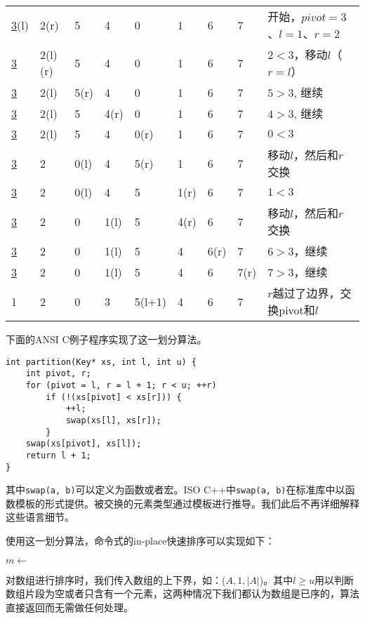 \documentclass[UTF8]{article}
\begin{document}
\begin{tabular}{|llllllll|l|}
\hline
\underline{3}(l)  & 2(r) & 5 & 4 & 0 & 1 & 6 & 7 & 开始，$pivot = 3$、$l = 1$、$r = 2$ \\
\underline{3} & 2(l)(r) & 5 & 4 & 0 & 1 & 6 & 7 & $2 < 3$，移动$l$（$r=l$）\\
\underline{3} & 2(l) & 5(r) & 4 & 0 & 1 & 6 & 7 & $5 > 3$, 继续 \\
\underline{3} & 2(l) & 5 & 4(r) & 0 & 1 & 6 & 7 & $4 > 3$, 继续 \\
\underline{3} & 2(l) & 5 & 4 & 0(r) & 1 & 6 & 7 & $0 < 3$ \\
\underline{3} & 2 & 0(l) & 4 & 5(r) & 1 & 6 & 7 & 移动$l$，然后和$r$交换 \\
\underline{3} & 2 & 0(l) & 4 & 5 & 1(r) & 6 & 7 & $1 < 3$ \\
\underline{3} & 2 & 0 & 1(l) & 5 & 4(r) & 6 & 7 & 移动$l$，然后和$r$交换 \\
\underline{3} & 2 & 0 & 1(l) & 5 & 4 & 6(r) & 7 & $6 > 3$，继续 \\
\underline{3} & 2 & 0 & 1(l) & 5 & 4 & 6 & 7(r) & $7 > 3$，继续 \\
1 & 2 & 0 & 3 & 5(l+1) & 4 & 6 & 7 & $r$越过了边界，交换pivot和$l$ \\
\hline
\end{tabular}

下面的ANSI C例子程序实现了这一划分算法。

\lstset{language=C}
\begin{lstlisting}
int partition(Key* xs, int l, int u) {
    int pivot, r;
    for (pivot = l, r = l + 1; r < u; ++r)
        if (!(xs[pivot] < xs[r])) {
            ++l;
            swap(xs[l], xs[r]);
        }
    swap(xs[pivot], xs[l]);
    return l + 1;
}
\end{lstlisting}

其中\texttt{swap(a, b)}可以定义为函数或者宏。ISO C++中\texttt{swap(a, b)}在标准库中以函数模板的形式提供。被交换的元素类型通过模板进行推导。我们此后不再详细解释这些语言细节。

使用这一划分算法，命令式的in-place快速排序可以实现如下：

\begin{algorithmic}[1]
    \State $m \gets$ 
    \State {}
    \State {}
  \EndIf
\EndProcedure
\end{algorithmic}

对数组进行排序时，我们传入数组的上下界，如：($A, 1, |A|$)。其中$l \geq u$用以判断数组片段为空或者只含有一个元素，这两种情况下我们都认为数组是已序的，算法直接返回而无需做任何处理。
\end{document}
